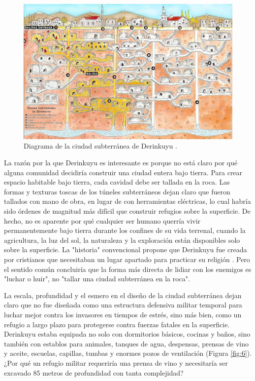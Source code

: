 \documentclass[10pt,twocolumn,letterpaper]{article}
\begin{document}
\begin{figure}[b]
\begin{center}
   \includegraphics[width=1\linewidth]{derinkuyu.jpeg}
\end{center}
   \caption{Diagrama de la ciudad subterránea de Derinkuyu \cite{56}.}
\label{fig:5}
\label{fig:onecol}
\end{figure}
La razón por la que Derinkuyu es interesante es porque no está claro por qué alguna comunidad decidiría construir una ciudad entera bajo tierra. Para crear espacio habitable bajo tierra, cada cavidad debe ser tallada en la roca. Las formas y texturas toscas de los túneles subterráneos dejan claro que fueron tallados con mano de obra, en lugar de con herramientas eléctricas, lo cual habría sido órdenes de magnitud más difícil que construir refugios sobre la superficie. De hecho, no es aparente por qué cualquier ser humano querría vivir permanentemente bajo tierra durante los confines de su vida terrenal, cuando la agricultura, la luz del sol, la naturaleza y la exploración están disponibles solo sobre la superficie. La "historia" convencional propone que Derinkuyu fue creada por cristianos que necesitaban un lugar apartado para practicar su religión \cite{53}. Pero el sentido común concluiría que la forma más directa de lidiar con los enemigos es "luchar o huir", no "tallar una ciudad subterránea en la roca".

La escala, profundidad y el esmero en el diseño de la ciudad subterránea dejan claro que no fue diseñada como una estructura defensiva militar temporal para luchar mejor contra los invasores en tiempos de estrés, sino más bien, como un refugio a largo plazo para protegerse contra fuerzas fatales en la superficie. Derinkuyu estaba equipada no solo con dormitorios básicos, cocinas y baños, sino también con establos para animales, tanques de agua, despensas, prensas de vino y aceite, escuelas, capillas, tumbas y enormes pozos de ventilación (Figura \ref{fig:6}). ¿Por qué un refugio militar requeriría una prensa de vino y necesitaría ser excavado 85 metros de profundidad con tanta complejidad?
\end{document}
